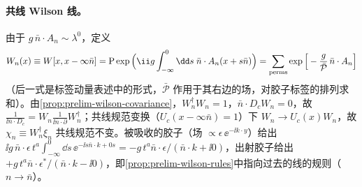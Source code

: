 \paragraph{共线 Wilson 线。}
由于 $g\,\bar n\cdot A_n\sim\lambda^0$，定义
\begin{equation}\label{eq:scet-Wn}
W_n(x)\equiv W[x,x-\infty\bar n]=\mathrm P\exp\Big(\ii g\int_{-\infty}^0\dd s\;\bar n\cdot A_n(x+s\bar n)\Big)
=\sum_{\rm perms}\exp\Big[-\frac{g}{\bar{\mathcal P}}\,\bar n\cdot A_n\Big]
\end{equation}
（后一式是标签动量表述中的形式\cite{BauerEtAl2001,BauerPirjolStewart2001}，$\bar{\mathcal P}$ 作用于其右边的场，对胶子标签的排列求和）。由\cref{prop:prelim-wilson-covariance}，$W_n^\dagger W_n=1$，$\bar n\cdot D_cW_n=0$，故 $\frac{1}{\ii\bar n\cdot D_c}=W_n\frac{1}{\ii\bar n\cdot\partial}W_n^\dagger$；共线规范变换（$U_c(x-\infty\bar n)=1$）下 $W_n\to U_c(x)W_n$，故 $\chi_n\equiv W_n^\dagger\xi_n$ 共线规范不变。被吸收的胶子（场 $\propto\epsilon\,\ee^{-\ii k\cdot y}$）给出 $\ii g\,\bar n\cdot\epsilon\,t^a\int_{-\infty}^0\dd s\,\ee^{-\ii s\bar n\cdot k+0s}=-g\,t^a\bar n\cdot\epsilon/(\bar n\cdot k+\ii0)$，出射胶子给出 $+g\,t^a\bar n\cdot\epsilon^*/(\bar n\cdot k-\ii0)$，即\cref{prop:prelim-wilson-rules}中指向过去的线的规则（$n\to\bar n$）。

